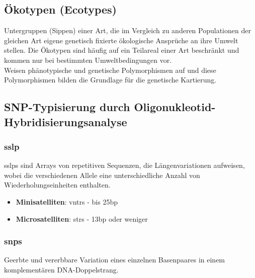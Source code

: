 \subsection{Ökotypen (Ecotypes)} 
Untergruppen (Sippen) einer Art, die im Vergleich zu anderen Populationen der gleichen Art eigene genetisch fixierte ökologische Ansprüche an ihre Umwelt stellen. Die Ökotypen sind häufig auf ein Teilareal einer Art beschränkt und kommen nur bei bestimmten Umweltbedingungen vor. \\
Weisen phänotypische und genetische Polymorphismen auf und diese Polymorphismen bilden die Grundlage für die genetische Kartierung.


\subsection{SNP-Typisierung durch Oligonukleotid-Hybridisierungsanalyse}  
\subsubsection{\gls{sslp}}
\glspl{sslp} sind Arrays von repetitiven Sequenzen, die Längenvariationen aufweisen, wobei die verschiedenen Allele eine unterschiedliche Anzahl von Wiederholungseinheiten enthalten.
\begin{itemize}
    \item \textbf{Minisatelliten}: \glspl{vntr} - bis 25bp 
    \item \textbf{Microsatelliten}: \glspl{str} - 13bp oder weniger 
\end{itemize}
\subsubsection{\glspl{snp}}
 Geerbte und vererbbare Variation eines einzelnen Basenpaares in einem komplementären DNA-Doppelstrang.
